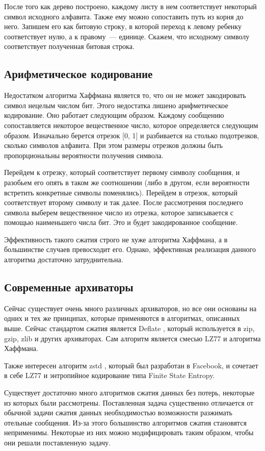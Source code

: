 После того как дерево построено, каждому листу в нем соответствует некоторый символ исходного алфавита. Также ему можно сопоставить 
путь из корня до него. Запишем его как битовую строку, в которой переход к левому ребенку соответствует нулю, а к правому~--- единице.
Скажем, что исходному символу соответствует полученная битовая строка.

\subsection{Арифметическое кодирование}

Недостатком алгоритма Хаффмана является то, что он не может закодировать символ нецелым числом бит. Этого недостатка лишено арифметическое кодирование.
Оно работает следующим образом. Каждому сообщению сопоставляется некоторое вещественное число, которое определяется следующим образом. Изначально берется отрезок [0, 1] и разбивается
на столько подотрезков, сколько символов алфавита. При этом размеры отрезков должны быть пропорциональны вероятности получения символа.

Перейдем к отрезку, который соответствует первому символу сообщения, и разобьем его опять в таком же соотношении (либо в другом, если вероятности встретить конкретные символы поменялись).
Перейдем в отрезок, который соответствует второму символу и так далее. После рассмотрения последнего символа выберем вещественное число из отрезка, которое записывается с помощью
наименьшего числа бит. Это и будет закодированное сообщение.

Эффективность такого сжатия строго не хуже алгоритма Хаффмана, а в большинстве случаев превосходит его. Однако, эффективная реализация данного алгоритма достаточно затруднительна. 

\subsection{Современные архиваторы}

Сейчас существует очень много различных архиваторов, но все они основаны на одних и тех же принципах, которые применяются в алгоритмах, описанных выше.
Сейчас стандартом сжатия является Deflate \cite{facebook}, который
используется в zip, gzip, zlib и других архиваторах. Сам алгоритм является смесью LZ77 и алгоритма Хаффмана.

Также интересен алгоритм zstd \cite{zstd-wiki}, который был разработан в Facebook, и сочетает в себе LZ77 и энтропийное кодирование типа Finite State Entropy.

\chapterconclusion

Существует достаточно много алгоритмов сжатия данных без потерь, некоторые из которых были рассмотрены. Поставленная задача существенно отличается от обычной задачи сжатия данных
необходимостью возможности разжимать отельные сообщения. Из-за этого большинство алгоритмов сжатия становятся неприменимы. Некоторые из них можно модифицировать таким образом,
чтобы они решали поставленную задачу. 